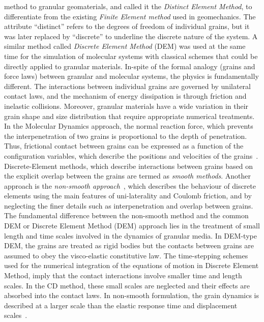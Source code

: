 method to granular geomaterials, and called it the \textit{Distinct Element 
Method}, to differentiate from the existing \textit{Finite Element method} used 
in geomechanics. The attribute ``distinct'' refers to the degrees of freedom of 
individual grains, but it was later replaced by ``discrete'' to underline 
the discrete nature of the system. A similar method called \textit{Discrete 
Element Method} (DEM) was used at the same time for the simulation of molecular 
systems with classical schemes that could be directly applied to granular 
materials. In-spite of the formal analogy (grains and force laws) between 
granular and molecular systems, the physics is fundamentally different. The 
interactions between individual grains are governed by unilateral contact laws, 
and the mechanism of energy dissipation is through friction and inelastic 
collisions. Moreover, granular materials have a wide variation in their 
grain shape and size distribution that require appropriate numerical 
treatments. In the Molecular Dynamics approach, the normal reaction force, 
which prevents the interpenetration of two grains is proportional to the depth 
of penetration. Thus, frictional contact between grains can be expressed 
as a function of the configuration variables, which describe the positions and 
velocities of the grains~\citep{Radjai2011}. Discrete-Element methods, which 
describe interactions between grains based on the explicit overlap between the 
grains are termed as \textit{smooth methods}. Another approach is the 
\textit{non-smooth approach}~\citep{Jean1999}, which describes the behaviour of 
discrete elements using the main features of uni-laterality and Coulomb 
friction, and by neglecting the finer details such as interpenetration and 
overlap between grains. The fundamental difference 
between the non-smooth method and the common DEM or Discrete Element Method 
(DEM) approach lies in the treatment of small length and time scales involved 
in the dynamics of granular media. In DEM-type DEM, the grains are treated 
as rigid bodies but the contacts between grains are assumed to obey the 
visco-elastic constitutive law. The time-stepping schemes used for the 
numerical integration of the equations of motion in Discrete Element Method, 
imply that the contact interactions involve smaller time and length scales. In 
the CD method, these small scales are neglected and their effects are absorbed 
into the contact laws. In non-smooth formulation, the grain dynamics is 
described at a larger scale than the elastic response time and displacement 
scales~\citep{Jean1999, Radjai2009}. 


